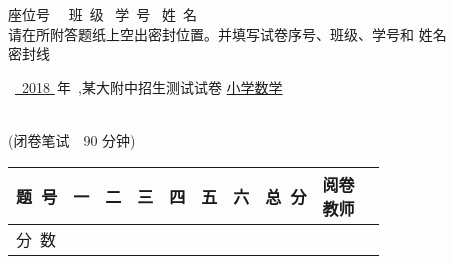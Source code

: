 \documentclass[twocolumn,landscape,UTF8]{ctexart}
\newcommand{\putzdx}{\marginpar{
		\parbox{1cm}{\vspace{-1.6cm}
			\rotatebox[origin=c]{90}{
				\usebox{\zdx}
		}}
}}
\begin{document}
\fancyhf{}
\sbox{\zdx}
{\parbox{27cm}{\centering
	座位号~\underline{\makebox[34mm][c]{}}~ 班~级\underline{\makebox[34mm][c]{}}~ 学~号\underline{\makebox[44mm][c]{}}~ 姓~名\underline{\makebox[34mm][c]{}} ~\\
	\vspace{3mm}
请在所附答题纸上空出密封位置。并填写试卷序号、班级、学号和 姓名\\
\vspace{1mm}
\dotfill{} 密\dotfill{}封\dotfill{}线\dotfill{} \\
	}}
	\reversemarginpar
	
\begin{spacing}{1.25}
	\begin{center}
\begin{LARGE}

~\underline{~2018 }\,年~,某大附中招生测试试卷 \underline{小学数学}\\\

\end{LARGE}
\vspace{0.3cm}
(闭卷笔试\ \ 90 分钟)\\
	\vspace{0.5cm}
\begin{tabular}{|m{}|*{8}{m{}|}p{}|}
	\hline
\centering  题~号 & \centering 一 & \centering 二 & \centering 三 & \centering 四& \centering 五 & \centering 六 %
& \centering 总~分 & \makecell{阅卷\\教师} \rule{0pt}{3mm} \\
	\hline
	\centering 分~数 &  &  &  &  &  &  &  &  %
	\rule{0pt}{8mm} \\\hline
\end{tabular}
\end{center}
\end{spacing}
\vspace{-0.5cm}
\setlength{\marginparsep}{1.7cm}
\putzdx %
\end{document}
